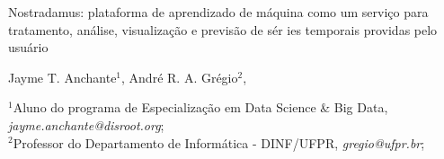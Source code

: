 \documentclass[portrait, 24pt, final]{sciposter}
\begin{document}


\vspace{10cm}

\noindent
\begin{minipage}[c][10cm][c]{0.75\textwidth}

  \vspace{6ex}
  {\Huge
	Nostradamus: plataforma de aprendizado de máquina como um serviço para tratamento, análise, visualização e previsão de sér    ies temporais providas pelo usuário}

  \vspace{1ex}
  {\Large
    Jayme T. Anchante$^1$,
    André R. A. Grégio$^2$,
  }

  \vspace{1ex}
  $^1${Aluno do programa de Especialização em Data Science \& Big Data, {\it jayme.anchante@disroot.org}};\\
  $^2${Professor do Departamento de Informática - DINF/UFPR, {\it gregio@ufpr.br}};\\

\end{minipage}

\vspace{3cm}

\end{document}
